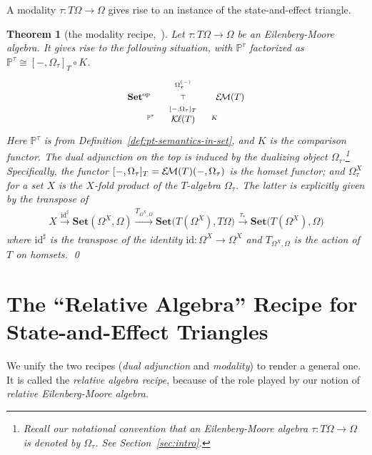 \documentclass[9pt, preprint]{sigplanconf}
\theoremstyle{theorem}
\newtheorem{theorem}{Theorem}[section]
\theoremstyle{definition}
\newcommand{\place}{{-}}
\newcommand{\op}{\mathrm{op}}
\newcommand{\id}{\mathrm{id}}
\newcommand{\Set}{\mathbf{Set}}
\newcommand{\EM}{\mathcal{E}{\kern-.5ex}\mathcal{M}}
\newcommand{\Kl}{\mathcal{K}{\kern-.2ex}\ell}
\newcommand{\co}{\mathrel{\circ}}
\newcommand{\bbP}{\mathbb{P}}
\begin{document}
A modality $\tau\colon T\Omega\to \Omega$  gives rise to
an instance of the state-and-effect triangle.



\begin{theorem}[{the modality
 recipe,~\cite{Hasuo14,Hasuo15TCS}}]\label{thm:theModalityRecipe}
 Let $\tau\colon T\Omega\to \Omega$ be an Eilenberg-Moore algebra.
 It gives rise to the following situation, with $\bbP^{\tau}$
 factorized as  $\bbP^{\tau}\cong [\place, \Omega_{\tau}]_{T}\co K$.
  \begin{equation}\label{eq:theModalityRecipe}
   	\small
    \xymatrix@R-1.8em@C-1em{
      \Set^{\op} \ar@/^/[rr]^-{\Omega_{\tau}^{(\place)}} \ar@{}[rr]|-{\top}
      &&  \EM(T)\ar@/^/[ll]^-{[\place, \Omega_{\tau}]_{T}} \\
      & \Kl(T) \ar@/^/[ul]^-{\bbP^{\tau}} \ar@/_/[ur]_-{K}
    }
  \end{equation}
 Here $\bbP^{\tau}$ is from Definition~\ref{def:pt-semantics-in-set}, and
 $K$ is the comparison functor. The dual adjunction on the top  is
 induced by the dualizing object $\Omega_{\tau}$.\footnote{Recall our
 notational convention that an Eilenberg-Moore algebra $\tau\colon
 T\Omega\to \Omega$ is denoted by $\Omega_{\tau}$. See
 Section~\ref{sec:intro}. }
Specifically, the
 functor $[\place, \Omega_{\tau}]_{T}=\EM(T)(\place, \Omega_{\tau}) $
 is the homset functor; and $\Omega_{\tau}^X$  for a set $X$ is the
 $X$-fold product of the $T$-algebra $\Omega_{\tau}$. The latter is
 explicitly given by the transpose of
 \begin{align*}
  X \stackrel{\id^{\sharp}}{\to} \Set(\Omega^X, \Omega)
  \xrightarrow{\!T_{\Omega^{X},\Omega}\!} \Set\bigl(T(\Omega^X), T{\Omega}\bigr)
  \stackrel{\tau_*}{\to} \Set\bigl(T(\Omega^X), \Omega\bigr)
 \end{align*}
 where $\id^{\sharp}$ is the transpose of
 the identity $\id \colon \Omega^X \to \Omega^X$
 and $T_{\Omega^{X},\Omega}$ is the action of $T$ on homsets.
\qed
\end{theorem}

\section{The ``Relative Algebra'' Recipe for State-and-Effect Triangles}
\label{sec:relativeAlgebraRecipe}
We unify the two recipes (\emph{dual adjunction} and \emph{modality}) to render a general one. It is called the
\emph{relative algebra recipe}, because of the  role played by
our notion of \emph{relative Eilenberg-Moore algebra}.
\end{document}
